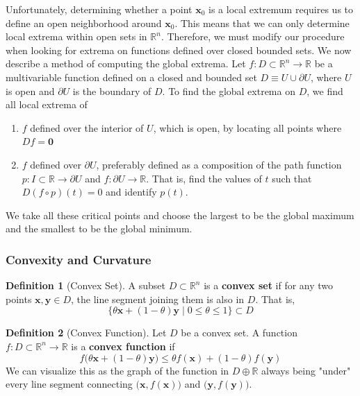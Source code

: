 \documentclass{article}
\theoremstyle{remark}
\theoremstyle{definition}
\newtheorem{definition}{Definition}[section]
\begin{document}
Unfortunately, determining whether a point $\mathbf{x}_0$ is a local extremum requires us to define an open neighborhood around $\mathbf{x}_0$. This means that we can only determine local extrema within open sets in $\mathbb{R}^n$. Therefore, we must modify our procedure when looking for extrema on functions defined over closed bounded sets. We now describe a method of computing the global extrema. Let $f: D \subset \mathbb{R}^n \longrightarrow \mathbb{R}$ be a multivariable function defined on a closed and bounded set $D \equiv U \cup \partial U$, where $U$ is open and $\partial U$ is the boundary of $D$. To find the global extrema on $D$, we find all local extrema of 
\begin{enumerate}
    \item $f$ defined over the interior of $U$, which is open, by locating all points where $D f = \mathbf{0}$ 
    \item $f$ defined over $\partial U$, preferably defined as a composition of the path function $p: I \subset \mathbb{R} \longrightarrow \partial U$ and $f: \partial U \longrightarrow \mathbb{R}$. That is, find the values of $t$ such that $D (f \circ p) (t) = 0$ and identify $p(t)$. 
\end{enumerate}
We take all these critical points and choose the largest to be the global maximum and the smallest to be the global minimum. 

\subsubsection{Convexity and Curvature}

\begin{definition}[Convex Set]
A subset $D \subset \mathbb{R}^n$ is a \textbf{convex set} if for any two points $\mathbf{x}, \mathbf{y} \in D$, the line segment joining them is also in $D$. That is, 
\[\{ \theta \mathbf{x} + (1 - \theta) \mathbf{y} \mid 0 \leq \theta \leq 1\} \subset D\]
\end{definition}

\begin{definition}[Convex Function]
Let $D$ be a convex set. A function $f: D \subset \mathbb{R}^n \longrightarrow \mathbb{R}$ is a \textbf{convex function} if 
\[f\big( \theta \mathbf{x} + (1 - \theta) \mathbf{y} \big) \leq \theta f(\mathbf{x}) + (1 - \theta) f(\mathbf{y})\]
We can visualize this as the graph of the function in $D \oplus \mathbb{R}$ always being "under" every line segment connecting $\big( \mathbf{x}, f(\mathbf{x})\big)$ and $\big( \mathbf{y}, f(\mathbf{y}) \big)$. 
\end{definition}
\end{document}
